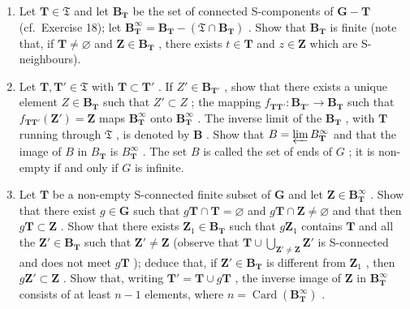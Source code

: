 \begin{enumerate}
\def\labelenumi{(\alph{enumi})}
\item
  Let \(\mathbf{T} \in \mathfrak{T}\) and let \(\mathbf{B}_{\mathbf{T}}\) be the set of connected S-components of \(\mathbf{G} - \mathbf{T}\) (cf.~Exercise 18); let \(\mathbf{B}_{\mathbf{T}}^{\infty} = \mathbf{B}_{\mathbf{T}} - (\mathfrak{T} \cap \mathbf{B}_{\mathbf{T}})\) . Show that \(\mathbf{B}_{\mathbf{T}}\) is finite (note that, if \(\mathbf{T} \neq \varnothing\) and \(\mathbf{Z} \in \mathbf{B}_{\mathbf{T}}\) , there exists \(t \in \mathbf{T}\) and \(z \in \mathbf{Z}\) which are S-neighbours).
\item
  Let \(\mathbf{T}, \mathbf{T}' \in \mathfrak{T}\) with \(\mathbf{T} \subset \mathbf{T}'\) . If \(Z' \in \mathbf{B}_{\mathbf{T}'}\) , show that there exists a unique element \(Z \in \mathbf{B}_{\mathbf{T}}\) such that \(Z' \subset Z\) ; the mapping \(f_{\mathbf{T}\mathbf{T}'}: \mathbf{B}_{\mathbf{T}'} \to \mathbf{B}_{\mathbf{T}}\) such that \(f_{\mathbf{T}\mathbf{T}'}(\mathbf{Z}') = \mathbf{Z}\) maps \(\mathbf{B}_{\mathbf{T}}^{\infty}\) onto \(\mathbf{B}_{\mathbf{T}}^{\infty}\) . The inverse limit of the \(\mathbf{B}_{\mathbf{T}}\) , with \(\mathbf{T}\) running through \(\mathfrak{T}\) , is denoted by \(\mathbf{B}\) . Show that \(B = \varprojlim B_{\mathbf{T}}^{\infty}\) and that the image of \(B\) in \(B_{\mathbf{T}}\) is \(B_{\mathbf{T}}^{\infty}\) . The set \(B\) is called the set of ends of \(G\) ; it is non-empty if and only if \(G\) is infinite.
\item
  Let \(\mathbf{T}\) be a non-empty S-connected finite subset of \(\mathbf{G}\) and let \(\mathbf{Z} \in \mathbf{B}_{\mathbf{T}}^{\infty}\) . Show that there exist \(g \in \mathbf{G}\) such that \(g\mathbf{T} \cap \mathbf{T} = \varnothing\) and \(g\mathbf{T} \cap \mathbf{Z} \neq \varnothing\) and that then \(g\mathbf{T} \subset \mathbf{Z}\) . Show that there exists \(\mathbf{Z}_1 \in \mathbf{B}_{\mathbf{T}}\) such that \(g\mathbf{Z}_1\) contains \(\mathbf{T}\) and all the \(\mathbf{Z}' \in \mathbf{B}_{\mathbf{T}}\) such that \(\mathbf{Z}' \neq \mathbf{Z}\) (observe that \(\mathbf{T} \cup \bigcup_{\mathbf{Z}' \neq \mathbf{Z}} \mathbf{Z}'\) is S-connected and does not meet \(g\mathbf{T}\) ); deduce that, if \(\mathbf{Z}' \in \mathbf{B}_{\mathbf{T}}\) is different from \(\mathbf{Z}_1\) , then \(g\mathbf{Z}' \subset \mathbf{Z}\) . Show that, writing \(\mathbf{T}' = \mathbf{T} \cup g\mathbf{T}\) , the inverse image of \(\mathbf{Z}\) in \(\mathbf{B}_{\mathbf{T}}^{\infty}\) consists of at least \(n - 1\) elements, where \(n = \operatorname{Card}(\mathbf{B}_{\mathbf{T}}^{\infty})\) .

\end{enumerate}
